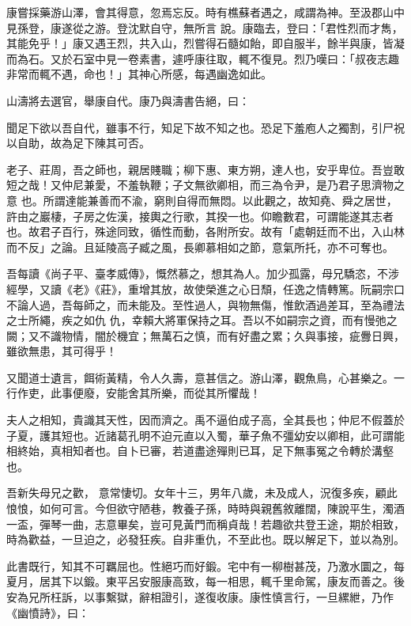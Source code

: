 \begin{pinyinscope}
 康嘗採藥游山澤，會其得意，忽焉忘反。時有樵蘇者遇之，咸謂為神。至汲郡山中見孫登，康遂從之游。登沈默自守，無所言
 說。康臨去，登曰：「君性烈而才雋，其能免乎！」康又遇王烈，共入山，烈嘗得石髓如飴，即自服半，餘半與康，皆凝而為石。又於石室中見一卷素書，遽呼康往取，輒不復見。烈乃嘆曰：「叔夜志趣非常而輒不遇，命也！」其神心所感，每遇幽逸如此。



 山濤將去選官，舉康自代。康乃與濤書告絕，曰：



 聞足下欲以吾自代，雖事不行，知足下故不知之也。恐足下羞庖人之獨割，引尸祝以自助，故為足下陳其可否。



 老子、莊周，吾之師也，親居賤職；柳下惠、東方朔，達人也，安乎卑位。吾豈敢短之哉！又仲尼兼愛，不羞執鞭；子文無欲卿相，而三為令尹，是乃君子思濟物之意
 也。所謂達能兼善而不渝，窮則自得而無悶。以此觀之，故知堯、舜之居世，許由之巖棲，子房之佐漢，接輿之行歌，其揆一也。仰瞻數君，可謂能遂其志者也。故君子百行，殊途同致，循性而動，各附所安。故有「處朝廷而不出，入山林而不反」之論。且延陵高子臧之風，長卿慕相如之節，意氣所托，亦不可奪也。



 吾每讀《尚子平、臺孝威傳》，慨然慕之，想其為人。加少孤露，母兄驕恣，不涉經學，又讀《老》《莊》，重增其放，故使榮進之心日頹，任逸之情轉篤。阮嗣宗口不論人過，吾每師之，而未能及。至性過人，與物無傷，惟飲酒過差耳，至為禮法之士所繩，疾之如仇
 仇，幸賴大將軍保持之耳。吾以不如嗣宗之資，而有慢弛之闕；又不識物情，闇於機宜；無萬石之慎，而有好盡之累；久與事接，疵釁日興，雖欲無患，其可得乎！



 又聞道士遺言，餌術黃精，令人久壽，意甚信之。游山澤，觀魚鳥，心甚樂之。一行作吏，此事便廢，安能舍其所樂，而從其所懼哉！



 夫人之相知，貴識其天性，因而濟之。禹不逼伯成子高，全其長也；仲尼不假蓋於子夏，護其短也。近諸葛孔明不迫元直以入蜀，華子魚不彊幼安以卿相，此可謂能相終始，真相知者也。自卜已審，若道盡途殫則已耳，足下無事冤之令轉於溝壑也。



 吾新失母兄之歡，
 意常悽切。女年十三，男年八歲，未及成人，況復多疾，顧此悢悢，如何可言。今但欲守陋巷，教養子孫，時時與親舊敘離闊，陳說平生，濁酒一盃，彈琴一曲，志意畢矣，豈可見黃門而稱貞哉！若趣欲共登王途，期於相致，時為歡益，一旦迫之，必發狂疾。自非重仇，不至此也。既以解足下，並以為別。



 此書既行，知其不可羈屈也。性絕巧而好鍛。宅中有一柳樹甚茂，乃激水圜之，每夏月，居其下以鍛。東平呂安服康高致，每一相思，輒千里命駕，康友而善之。後安為兄所枉訴，以事繫獄，辭相證引，遂復收康。康性慎言行，一旦縲紲，乃作《幽憤詩》，曰：




\end{pinyinscope}
